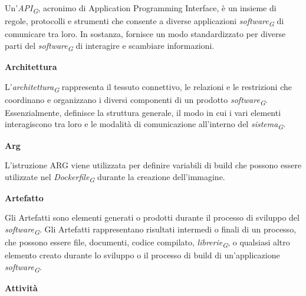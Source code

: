 \documentclass{article}
\begin{document}
\vspace{0.1cm}

Un'\textit{API}\textsubscript{\textit{G}}, acronimo di Application Programming Interface, è un insieme di regole, protocolli e strumenti che consente a diverse applicazioni \textit{software}\textsubscript{\textit{G}} di comunicare tra loro. In sostanza, fornisce un modo standardizzato per diverse parti del \textit{software}\textsubscript{\textit{G}} di interagire e scambiare informazioni.

\vspace{0.4cm}

\textbf{Architettura}

\vspace{0.1cm}

L'\textit{architettura}\textsubscript{\textit{G}} rappresenta il tessuto connettivo, le relazioni e le restrizioni che coordinano e organizzano i diversi componenti di un prodotto \textit{software}\textsubscript{\textit{G}}. Essenzialmente, definisce la struttura generale, il modo in cui i vari elementi interagiscono tra loro e le modalità di comunicazione all'interno del \textit{sistema}\textsubscript{\textit{G}}.

\pagebreak

\textbf{Arg}

\vspace{0.1cm}

L’istruzione ARG viene utilizzata per definire variabili di build che possono essere utilizzate nel \textit{Dockerfile}\textsubscript{\textit{G}} durante la creazione dell'immagine. 

\vspace{0.4cm}

\textbf{Artefatto}

\vspace{0.1cm}

Gli Artefatti sono elementi generati o prodotti durante il processo di sviluppo del \textit{software}\textsubscript{\textit{G}}. Gli Artefatti rappresentano risultati intermedi o finali di un processo, che possono essere file, documenti, codice compilato, \textit{librerie}\textsubscript{\textit{G}}, o qualsiasi altro elemento creato durante lo sviluppo o il processo di build di un'applicazione \textit{software}\textsubscript{\textit{G}}.

\vspace{0.4cm}

\textbf{Attività}

\vspace{0.1cm}
\end{document}
